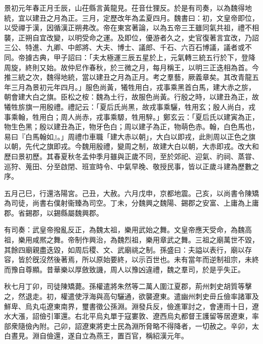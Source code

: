\begin{pinyinscope}
景初元年春正月壬辰，山茌縣言黃龍見。茌音仕狸反。於是有司奏，以為魏得地統，宜以建丑之月為正。三月，定歷改年為孟夏四月。魏書曰：初，文皇帝即位，以受禪于漢，因循漢正朔弗改。帝在東宮著論，以為五帝三王雖同氣共祖，禮不相襲，正朔自宜改變，以明受命之運。及即位，優游者久之，史官復著言宜改，乃詔三公、特進、九卿、中郎將、大夫、博士、議郎、千石、六百石博議，議者或不同。帝據古典，甲子詔曰：「夫太極運三辰五星於上，元氣轉三統五行於下，登降周旋，終則又始。故仲尼作春秋，於三微之月，每月稱王，以明三正迭相為首。今推三統之次，魏得地統，當以建丑之月為正月。考之羣藝，厥義章矣。其改青龍五年三月為景初元年四月。」服色尚黃，犧牲用白，戎事乘黑首白馬，建大赤之旂，朝會建大白之旗。臣松之桉：魏為土行，故服色尚黃。行殷之時，以建丑為正，故犧牲旂旗一用殷禮。禮記云：「夏后氏尚黑，故戎事乘驪，牲用玄；殷人尚白，戎事乘翰，牲用白；周人尚赤，戎事乘騵，牲用騂。」鄭玄云：「夏后氏以建寅為正，物生色黑；殷以建丑為正，物牙色白；周以建子為正，物萌色赤。翰，白色馬也，易曰『白馬翰如』。」周禮巾車職「建大赤以朝」，大白以即戎，此則周以正色之旗以朝，先代之旗即戎。今魏用殷禮，變周之制，故建大白以朝，大赤即戎。改大和歷曰景初歷。其春夏秋冬孟仲季月雖與正歲不同，至於郊祀、迎氣、礿祠、蒸甞、巡狩、蒐田、分至啟閉、班宣時令、中氣早晚、敬授民事，皆以正歲斗建為歷數之序。

五月己巳，行還洛陽宮。己丑，大赦。六月戊申，京都地震。己亥，以尚書令陳矯為司徒，尚書右僕射衞臻為司空。丁未，分魏興之魏陽、錫郡之安富、上庸為上庸郡。省錫郡，以錫縣屬魏興郡。

有司奏：武皇帝撥亂反正，為魏太祖，樂用武始之舞。文皇帝應天受命，為魏高祖，樂用咸熈之舞。帝制作興治，為魏烈祖，樂用章武之舞。三祖之廟萬世不毀，其餘四廟親盡迭毀，如周后稷、文、武廟祧之制。孫盛曰：夫謚以表行，廟以存容，皆於旣沒然後著焉，所以原始要終，以示百世也。未有當年而逆制祖宗，未終而豫自尊顯。昔華樂以厚斂致譏，周人以豫凶違禮，魏之羣司，於是乎失正。

秋七月丁卯，司徒陳矯薨。孫權遣將朱然等二萬人圍江夏郡，荊州刺史胡質等擊之，然退走。初，權遣使浮海與高句驪通，欲襲遼東。遣幽州刺史毌丘儉率諸軍及鮮卑、烏丸屯遼東南界，璽書徵公孫淵。淵發兵反，儉進軍討之，會連雨十日，遼水大漲，詔儉引軍還。右北平烏丸單于寇婁敦、遼西烏丸都督王護留等居遼東，率部衆隨儉內附。己卯，詔遼東將吏士民為淵所脅略不得降者，一切赦之。辛卯，太白晝見。淵自儉還，遂自立為燕王，置百官，稱紹漢元年。


\end{pinyinscope}
